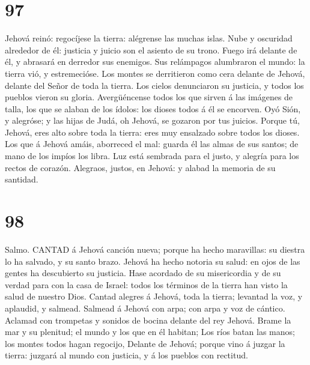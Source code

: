 \hypertarget{section-96}{%
\section{97}\label{section-96}}

 Jehová reinó: regocíjese la tierra: alégrense las muchas
islas.  Nube y oscuridad alrededor de él: justicia y juicio
son el asiento de su trono.  Fuego irá delante de él, y
abrasará en derredor sus enemigos.  Sus relámpagos
alumbraron el mundo: la tierra vió, y estremecióse.  Los
montes se derritieron como cera delante de Jehová, delante del Señor de
toda la tierra.  Los cielos denunciaron su justicia, y todos
los pueblos vieron su gloria.  Avergüéncense todos los que
sirven á las imágenes de talla, los que se alaban de los ídolos: los
dioses todos á él se encorven.  Oyó Sión, y alegróse; y las
hijas de Judá, oh Jehová, se gozaron por tus juicios. 
Porque tú, Jehová, eres alto sobre toda la tierra: eres muy ensalzado
sobre todos los dioses.  Los que á Jehová amáis, aborreced
el mal: guarda él las almas de sus santos; de mano de los impíos los
libra.  Luz está sembrada para el justo, y alegría para los
rectos de corazón.  Alegraos, justos, en Jehová: y alabad
la memoria de su santidad.

\hypertarget{section-97}{%
\section{98}\label{section-97}}

 Salmo. CANTAD á Jehová canción nueva; porque ha hecho
maravillas: su diestra lo ha salvado, y su santo brazo. 
Jehová ha hecho notoria su salud: en ojos de las gentes ha descubierto
su justicia.  Hase acordado de su misericordia y de su
verdad para con la casa de Israel: todos los términos de la tierra han
visto la salud de nuestro Dios.  Cantad alegres á Jehová,
toda la tierra; levantad la voz, y aplaudid, y salmead. 
Salmead á Jehová con arpa; con arpa y voz de cántico. 
Aclamad con trompetas y sonidos de bocina delante del rey Jehová.
 Brame la mar y su plenitud; el mundo y los que en él
habitan;  Los ríos batan las manos; los montes todos hagan
regocijo,  Delante de Jehová; porque vino á juzgar la
tierra: juzgará al mundo con justicia, y á los pueblos con rectitud.

